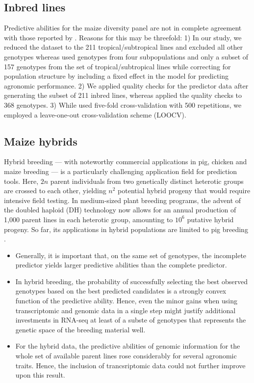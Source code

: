 \documentclass[12pt,titlepage]{article}
\begin{document}
\subsection{Inbred lines}
Predictive abilities for the maize diversity panel are not in complete
agreement with those reported by .
Reasons for this may be threefold: 
1) In our study, we reduced the dataset to the 211 tropical/subtropical lines 
and excluded all other genotypes whereas  used genotypes from 
four subpopulations and only a subset of 157 genotypes from the set of 
tropical/subtropical lines while correcting for population structure by
including a fixed effect in the model for predicting agronomic performance.
2) We applied quality checks for the predictor data after generating the subset
of 211 inbred lines, whereas  applied the quality checks to 368
genotypes.
3) While  used five-fold cross-validation with 500 repetitions,
we employed a leave-one-out cross-validation scheme (LOOCV).


\subsection{Maize hybrids}
Hybrid breeding --- with noteworthy commercial applications in pig, chicken and 
maize breeding --- is a particularly challenging application field for
prediction tools.
Here, $2n$ parent individuals from two genetically distinct heterotic groups are
crossed to each other, yielding $n^{2}$ potential hybrid progeny that would
require intensive field testing.
In medium-sized plant breeding programs, the advent of the doubled haploid (DH) 
technology \cite{Wedzony2009} now allows for an annual production of 1,000 
parent lines in each heterotic group, amounting to $10^{6}$ putative hybrid
progeny.
So far, its applications in hybrid populations are limited to pig breeding
\cite{Xiang2015,Xiang2016,Tusell2016}.

\begin{itemize}
  \item Generally, it is important that, on the same set of genotypes, the 
    incomplete predictor yields larger predictive abilities than the complete 
    predictor.
  \item In hybrid breeding, the probability of successfully selecting the best
    observed genotypes based on the best predicted candidates is a strongly 
    convex function of the predictive ability.
    Hence, even the minor gains when using transcriptomic and genomic data in a
    single step might justify additional investments in RNA-seq at least of a
    subste of genotypes that represents the genetic space of the breeding 
    material well.
  \item For the hybrid data, the predictive abilities of genomic information
    for the whole set of available parent lines rose considerably for several
    agronomic traits.
    Hence, the inclusion of trancsriptomic data could not further improve upon
    this result.
\end{itemize}
\end{document}
